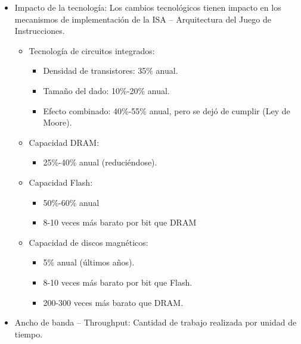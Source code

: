 \documentclass[12pt, twoside, openright]{report} %
\begin{document}
  \begin{itemize}
  
  \item
    Impacto de la tecnología: Los cambios tecnológicos tienen impacto en
    los mecanismos de implementación de la ISA -- Arquitectura del Juego
    de Instrucciones.

    \begin{itemize}
    
    \item
      Tecnología de circuitos integrados:

      \begin{itemize}
      
      \item
        Densidad de transistores: 35\% anual.
      \item
        Tamaño del dado: 10\%-20\% anual.
      \item
        Efecto combinado: 40\%-55\% anual, pero se dejó de cumplir (Ley
        de Moore).
      \end{itemize}
    \item
      Capacidad DRAM:

      \begin{itemize}
      
      \item
        25\%-40\% anual (reduciéndose).
      \end{itemize}
    \item
      Capacidad Flash:

      \begin{itemize}
      
      \item
        50\%-60\% anual
      \item
        8-10 veces más barato por bit que DRAM
      \end{itemize}
    \item
      Capacidad de discos magnéticos:

      \begin{itemize}
      
      \item
        5\% anual (últimos años).
      \item
        8-10 veces más barato por bit que Flash.
      \item
        200-300 veces más barato que DRAM.
      \end{itemize}
    \end{itemize}
  \item
    Ancho de banda -- Throughput: Cantidad de trabajo realizada por
    unidad de tiempo.


\end{itemize}
\end{document}
